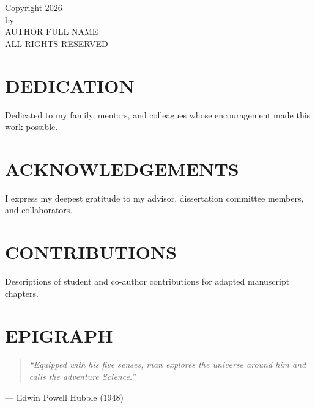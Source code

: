 \documentclass[12pt,oneside]{report}
\begin{document}

\setcounter{page}{2} %

\thispagestyle{fancy}
\begin{center}
  \vspace*{2.5in}
  Copyright 2026\\[0.2in]
  by\\[0.2in]
  AUTHOR FULL NAME\\[0.2in]
  ALL RIGHTS RESERVED
\end{center}
\clearpage

\chapter*{DEDICATION}
\doublespacing
Dedicated to my family, mentors, and colleagues whose encouragement made this work possible.
\clearpage

\chapter*{ACKNOWLEDGEMENTS}
\doublespacing
I express my deepest gratitude to my advisor, dissertation committee members, and collaborators.
\clearpage

\chapter*{CONTRIBUTIONS}
\doublespacing
Descriptions of student and co-author contributions for adapted manuscript chapters.
\clearpage

\chapter*{EPIGRAPH}
\doublespacing
\vspace*{1.5in}
\begin{quotation}
  \itshape
  ``Equipped with his five senses, man explores the universe around him and calls the adventure Science.''
\end{quotation}
\begin{flushright}
  --- Edwin Powell Hubble (1948)
\end{flushright}
\clearpage
\end{document}
